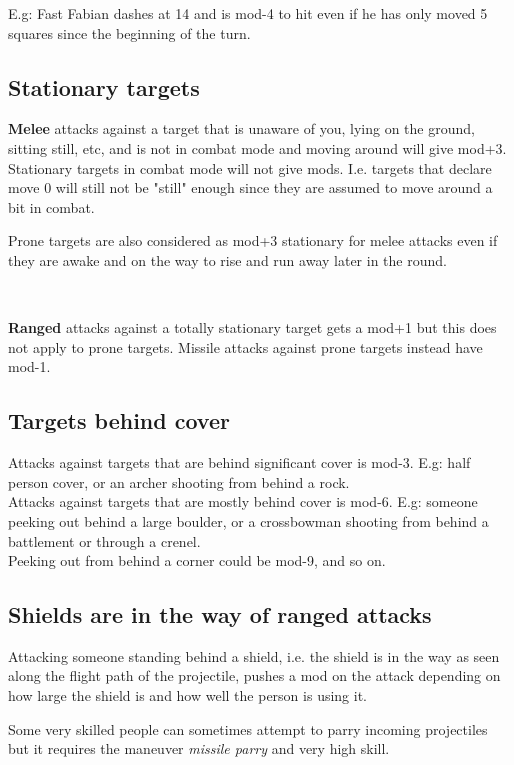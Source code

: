 E.g: Fast Fabian dashes at 14 and is mod-4 to hit even if he has only moved 5 squares since the beginning of the turn.


\subsection*{Stationary targets}
\textbf{Melee} attacks against a target that is unaware of you, lying on the ground, sitting still, etc, and is not in combat mode and moving around will give mod+3. Stationary targets in combat mode will not give mods. I.e. targets that declare move 0 will still not be "still" enough since they are assumed to move around a bit in combat.

Prone targets are also considered as mod+3 stationary for melee attacks even if they are awake and on the way to rise and run away later in the round. 

\

\noindent \textbf{Ranged} attacks against a totally stationary target gets a mod+1 but this does not apply to prone targets. Missile attacks against prone targets instead have mod-1.


\subsection*{Targets behind cover}
Attacks against targets that are behind significant cover is mod-3. E.g: half person cover, or an archer shooting from behind a rock. \\
Attacks against targets that are mostly behind cover is mod-6. E.g: someone peeking out behind a large boulder, or a crossbowman shooting from behind a battlement or through a crenel.\\
Peeking out from behind a corner could be mod-9, and so on.


\subsection*{Shields are in the way of ranged attacks}
Attacking someone standing behind a shield, i.e. the shield is in the way as seen along the flight path of the projectile, pushes a mod on the attack depending on how large the shield is and how well the person is using it.

Some very skilled people can sometimes attempt to parry incoming projectiles but it requires the maneuver \emph{missile parry} and very high skill.



